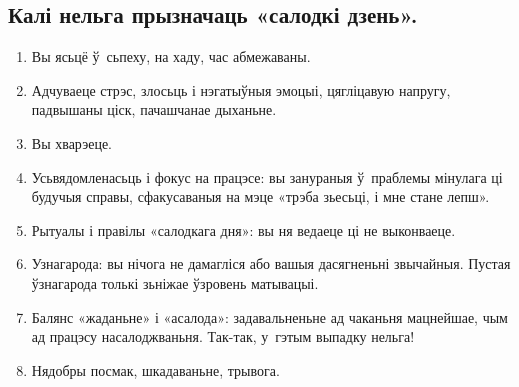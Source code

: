 \subsection{Калі нельга прызначаць «салодкі дзень».}
\begin{enumerate}[itemindent=3em,labelwidth=1.5em,leftmargin=0pt,nosep]
  \item Вы ясьцё ў~сьпеху, на хаду, час абмежаваны.
  \item Адчуваеце стрэс, злосьць і нэгатыўныя эмоцыі, цягліцавую напругу, падвышаны ціск, пачашчанае дыханьне.
  \item Вы хварэеце.
  \item Усьвядомленасьць і фокус на працэсе: вы занураныя ў~праблемы мінулага ці будучыя справы, сфакусаваныя на мэце «трэба зьесьці, і мне стане лепш».
  \item Рытуалы і правілы «салодкага дня»: вы ня ведаеце ці не выконваеце.
  \item Узнагарода: вы нічога не дамагліся або вашыя дасягненьні звычайныя. Пустая ўзнагарода толькі зьніжае ўзровень матывацыі.
  \item Балянс «жаданьне» і «асалода»: задавальненьне ад чаканьня мацнейшае, чым ад працэсу насалоджваньня. Так-так, у~гэтым выпадку нельга!
  \item Нядобры посмак, шкадаваньне, трывога.
\end{enumerate}